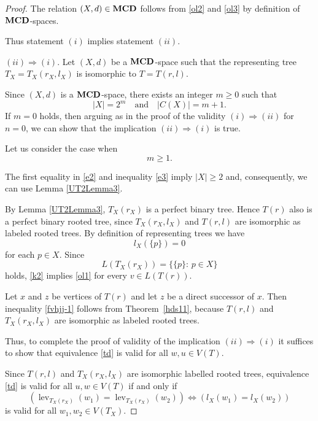 \documentclass{raex}
\theoremstyle{definition}
\theoremstyle{remark}
\numberwithin{equation}{section}
\begin{document}
\begin{proof}
The relation $(X,d)\in {\bf MCD}$ follows from \eqref{ol2} and \eqref{ol3} by definition of ${\bf MCD}$-spaces.



Thus statement $(i)$ implies statement $(ii)$.


$(ii)\Rightarrow(i).$
Let \((X,d)\) be a ${\bf MCD}$-space such that the representing
tree
\(
T_X=T_X(r_X,l_X)
\)
is isomorphic to
\(
T=T(r,l).
\)


Since $(X,d)$ is a ${\bf MCD}$-space, there exists an integer $m \geq 0$ such that
\begin{equation}
    \label{e2}
|X| = 2^m
\quad\text{and}\quad
|C(X)| = m + 1.
\end{equation}
If  $m=0$ holds, then arguing as in the proof of the validity
$(i)\Rightarrow(ii)$ for $n=0$, we can show that the implication
$(ii)\Rightarrow(i)$ is true.

Let us consider the case when 
\begin{equation}
    \label{e3}
    m\geq 1.
\end{equation}


The first equality in \eqref{e2} and inequality \eqref{e3} imply
 $|X|\geq 2$ and, consequently, we can use Lemma \ref{UT2Lemma3}.


By Lemma \ref{UT2Lemma3}, $T_X(r_X)$ is a perfect binary tree. Hence $T(r)$ also is a perfect binary rooted tree, since $T_X(r_X,l_X)$ and $T(r,l)$ are isomorphic as labeled rooted trees. By definition of representing trees we have
\begin{equation}\label{k2}
    l_X(\{p\})=0
\end{equation}
for each $p\in X$. Since 
\begin{equation*}
    L(T_X(r_X))=\{\{p\}:\,p\in X\}
\end{equation*}
holds, \eqref{k2} implies \eqref{ol1} for every $v\in L(T(r))$.

Let $x$ and $z$ be  vertices of $T(r)$  and let \(z\) be a direct successor of
\(x\). Then inequality \eqref{fvhjj-1} follows from Theorem~\ref{hds11}, because $T(r,l)$ and $T_X(r_X,l_X)$ are isomorphic as labeled rooted trees.

Thus, to complete the proof of  validity of the implication
\(
(ii)\Rightarrow(i)
\)
it suffices to show that equivalence \eqref{td}
is valid for all \(w,u\in V(T)\).


Since $T(r,l)$ and $T_{X}(r_{X},l_{X})$ are isomorphic labelled rooted trees, equivalence \eqref{td} is valid for all $u, w \in V(T)$ if and only if 
\begin{equation}
    \label{sss}
    \left( \operatorname{lev}_{T_X(r_X)}(w_1)=\operatorname{lev}_{T_X(r_X)}(w_2)\right) \iff     \left( l_X(w_1)=l_X(w_2)\right) 
\end{equation}
is valid for all \(w_1,w_2\in V(T_X)\).




\end{proof}
\end{document}
